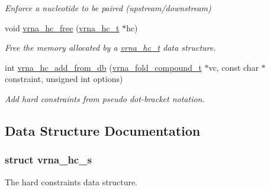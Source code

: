 \begin{DoxyCompactItemize}
\begin{DoxyCompactList}\small\item\em Enforce a nucleotide to be paired (upstream/downstream) \end{DoxyCompactList}\item 
void \hyperlink{group__hard__constraints_ga696dcf77887d856c6f21ea266d8b9ca2}{vrna\+\_\+hc\+\_\+free} (\hyperlink{group__hard__constraints_gac7e4c4f8abe3163a68110c5bff24e01d}{vrna\+\_\+hc\+\_\+t} $\ast$hc)
\begin{DoxyCompactList}\small\item\em Free the memory allocated by a \hyperlink{group__hard__constraints_gac7e4c4f8abe3163a68110c5bff24e01d}{vrna\+\_\+hc\+\_\+t} data structure. \end{DoxyCompactList}\item 
int \hyperlink{group__hard__constraints_ga5b4de3247b67358080c176b94591a8e6}{vrna\+\_\+hc\+\_\+add\+\_\+from\+\_\+db} (\hyperlink{group__fold__compound_ga1b0cef17fd40466cef5968eaeeff6166}{vrna\+\_\+fold\+\_\+compound\+\_\+t} $\ast$vc, const char $\ast$constraint, unsigned int options)
\begin{DoxyCompactList}\small\item\em Add hard constraints from pseudo dot-\/bracket notation. \end{DoxyCompactList}\end{DoxyCompactItemize}


\subsection{Data Structure Documentation}
\label{structvrna__hc__s}
\subsubsection{struct vrna\+\_\+hc\+\_\+s}
The hard constraints data structure. 

